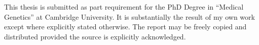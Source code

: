 
\begin{declaration}
This thesis is submitted as part requirement for the PhD Degree in ``Medical Genetics'' at Cambridge University.
It is substantially the result of my own work except where explicitly stated otherwise.
The report may be freely copied and distributed provided the source is explicitly acknowledged.
\end{declaration}

